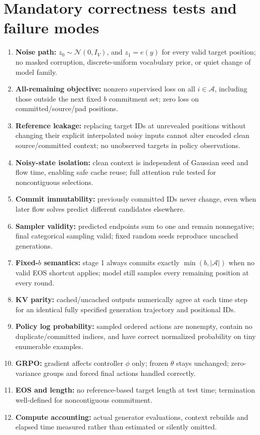 \documentclass[11pt,a4paper]{article}
\newcommand{\A}{\mathcal A}
\newcommand{\N}{\mathcal N}
\begin{document}
\section{Mandatory correctness tests and failure modes}
\begin{enumerate}
\item \textbf{Noise path:} $z_0\sim\N(0,I_V)$, and $z_1=e(y)$ for every valid target position; no masked corruption, discrete-uniform vocabulary prior, or quiet change of model family.
\item \textbf{All-remaining objective:} nonzero supervised loss on all $i\in\A$, including those outside the next fixed $b$ commitment set; zero loss on committed/source/pad positions.
\item \textbf{Reference leakage:} replacing target IDs at unrevealed positions without changing their explicit interpolated noisy inputs cannot alter encoded clean source/committed context; no unobserved targets in policy observations.
\item \textbf{Noisy-state isolation:} clean context is independent of Gaussian seed and flow time, enabling safe cache reuse; full attention rule tested for noncontiguous selections.
\item \textbf{Commit immutability:} previously committed IDs never change, even when later flow solves predict different candidates elsewhere.
\item \textbf{Sampler validity:} predicted endpoints sum to one and remain nonnegative; final categorical sampling valid; fixed random seeds reproduce uncached generations.
\item \textbf{Fixed-$b$ semantics:} stage 1 always commits exactly $\min(b,|\A|)$ when no valid EOS shortcut applies; model still samples every remaining position at every round.
\item \textbf{KV parity:} cached/uncached outputs numerically agree at each time step for an identical fully specified generation trajectory and positional IDs.
\item \textbf{Policy log probability:} sampled ordered actions are nonempty, contain no duplicate/committed indices, and have correct normalized probability on tiny enumerable examples.
\item \textbf{GRPO:} gradient affects controller $\phi$ only; frozen $\theta$ stays unchanged; zero-variance groups and forced final actions handled correctly.
\item \textbf{EOS and length:} no reference-based target length at test time; termination well-defined for noncontiguous commitment.
\item \textbf{Compute accounting:} actual generator evaluations, context rebuilds and elapsed time measured rather than estimated or silently omitted.
\end{enumerate}
\end{document}
